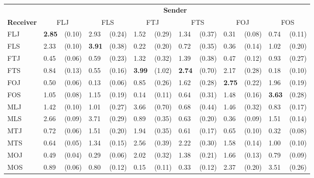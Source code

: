 
\begin{tabular}{ll@{\,\,\,}rl@{\,\,\,}rl@{\,\,\,}rl@{\,\,\,}rl@{\,\,\,}rl@{\,\,\,}r}
\toprule
    & \multicolumn{12}{c}{\textbf{Sender}} \\
    \cmidrule(lr){2- 13 }
\textbf{Receiver}
    & \multicolumn{2}{c}{\textnormal{FLJ}}
    & \multicolumn{2}{c}{\textnormal{FLS}}
    & \multicolumn{2}{c}{\textnormal{FTJ}}
    & \multicolumn{2}{c}{\textnormal{FTS}}
    & \multicolumn{2}{c}{\textnormal{FOJ}}
    & \multicolumn{2}{c}{\textnormal{FOS}} \\
    \cmidrule(lr){1-1}
    \cmidrule(lr){2-3}
    \cmidrule(lr){4-5}
    \cmidrule(lr){6-7}
    \cmidrule(lr){8-9}
    \cmidrule(lr){10-11}
    \cmidrule(lr){12-13}
    \textnormal{FLJ} & \textbf{2.85} & (0.10) & 2.93 & (0.24) & 1.52 & (0.29) & 1.34 & (0.37) & 0.31 & (0.08) & 0.74 & (0.11) \\
    \textnormal{FLS} & 2.33 & (0.10) & \textbf{3.91} & (0.38) & 0.22 & (0.20) & 0.72 & (0.35) & 0.36 & (0.14) & 1.02 & (0.20) \\
    \textnormal{FTJ} & 0.45 & (0.06) & 0.59 & (0.23) & 1.32 & (0.32) & 1.39 & (0.38) & 0.47 & (0.12) & 0.93 & (0.27) \\
    \textnormal{FTS} & 0.84 & (0.13) & 0.55 & (0.16) & \textbf{3.99} & (1.02) & \textbf{2.74} & (0.70) & 2.17 & (0.28) & 0.18 & (0.10) \\
    \textnormal{FOJ} & 0.50 & (0.06) & 0.13 & (0.06) & 0.85 & (0.26) & 1.62 & (0.28) & \textbf{2.75} & (0.22) & 1.96 & (0.19) \\
    \textnormal{FOS} & 1.05 & (0.08) & 1.15 & (0.19) & 0.14 & (0.11) & 0.64 & (0.31) & 1.48 & (0.16) & \textbf{3.63} & (0.28) \\
    \textnormal{MLJ} & 1.42 & (0.10) & 1.01 & (0.27) & 3.66 & (0.70) & 0.68 & (0.44) & 1.46 & (0.32) & 0.83 & (0.17) \\
    \textnormal{MLS} & 2.66 & (0.09) & 3.71 & (0.29) & 0.89 & (0.35) & 0.63 & (0.20) & 0.36 & (0.09) & 1.51 & (0.14) \\
    \textnormal{MTJ} & 0.72 & (0.06) & 1.51 & (0.20) & 1.94 & (0.35) & 0.61 & (0.17) & 0.65 & (0.10) & 0.32 & (0.08) \\
    \textnormal{MTS} & 0.64 & (0.05) & 1.34 & (0.15) & 2.56 & (0.39) & 2.22 & (0.30) & 1.58 & (0.14) & 1.00 & (0.10) \\
    \textnormal{MOJ} & 0.49 & (0.04) & 0.29 & (0.06) & 2.02 & (0.32) & 1.38 & (0.21) & 1.66 & (0.13) & 0.79 & (0.09) \\
    \textnormal{MOS} & 0.89 & (0.06) & 0.80 & (0.12) & 0.15 & (0.11) & 0.33 & (0.12) & 2.37 & (0.20) & 3.51 & (0.26) \\
\end{tabular}


